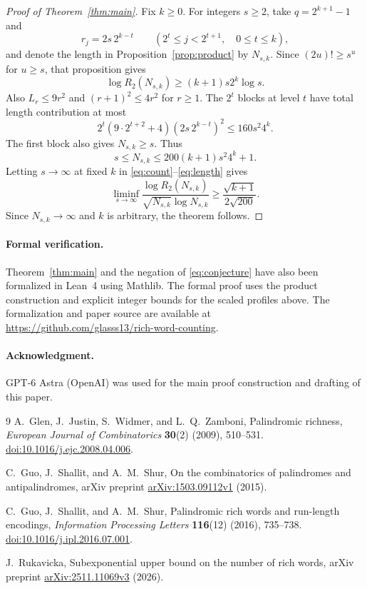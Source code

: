 \documentclass[10pt]{article}
\begin{document}
\begin{proof}[Proof of Theorem~\ref{thm:main}]
Fix $k\ge0$. For integers $s\ge2$, take $q=2^{k+1}-1$ and
\[
 r_j=2s\,2^{k-t}\qquad(2^t\le j<2^{t+1},\quad 0\le t\le k),
\]
and denote the length in Proposition~\ref{prop:product} by $N_{s,k}$.
Since $(2u)!\ge s^u$ for $u\ge s$, that proposition gives
\begin{equation}\label{eq:count}
 \log R_2(N_{s,k})\ge (k+1)s2^k\log s.
\end{equation}
Also $L_r\le9r^2$ and $(r+1)^2\le4r^2$ for $r\ge1$.
The $2^t$ blocks at level $t$ have total length contribution at most
\[
 2^t(9\cdot2^{t+2}+4)(2s\,2^{k-t})^2
 \le160s^2 4^k.
\]
The first block also gives $N_{s,k}\ge s$. Thus
\begin{equation}\label{eq:length}
 s\le N_{s,k}\le200(k+1)s^2 4^k+1.
\end{equation}
Letting $s\to\infty$ at fixed $k$ in
\eqref{eq:count}--\eqref{eq:length} gives
\[
 \liminf_{s\to\infty}
 \frac{\log R_2(N_{s,k})}{\sqrt{N_{s,k}}\log N_{s,k}}
 \ge \frac{\sqrt{k+1}}{2\sqrt{200}}.
\]
Since $N_{s,k}\to\infty$ and $k$ is arbitrary, the theorem follows.
\end{proof}

\paragraph{Formal verification.}
Theorem~\ref{thm:main} and the negation of \eqref{eq:conjecture} have
also been formalized in Lean~4 using Mathlib. The formal proof uses the
product construction and explicit integer bounds for the scaled profiles above.
The formalization and paper source are available at\\
\url{https://github.com/glasss13/rich-word-counting}.

\paragraph{Acknowledgment.}
GPT-6 Astra (OpenAI) was used for the main proof construction and drafting
of this paper.

\begin{thebibliography}{9}
A.~Glen, J.~Justin, S.~Widmer, and L.~Q.~Zamboni,
Palindromic richness,
\emph{European Journal of Combinatorics} \textbf{30}(2) (2009), 510--531.
\href{https://doi.org/10.1016/j.ejc.2008.04.006}{doi:10.1016/j.ejc.2008.04.006}.

C.~Guo, J.~Shallit, and A.~M.~Shur,
On the combinatorics of palindromes and antipalindromes,
arXiv preprint \href{https://arxiv.org/abs/1503.09112v1}{arXiv:1503.09112v1} (2015).

C.~Guo, J.~Shallit, and A.~M.~Shur,
Palindromic rich words and run-length encodings,
\emph{Information Processing Letters} \textbf{116}(12) (2016), 735--738.
\href{https://doi.org/10.1016/j.ipl.2016.07.001}{doi:10.1016/j.ipl.2016.07.001}.

J.~Rukavicka, Subexponential upper bound on the number of rich words,
arXiv preprint \href{https://arxiv.org/abs/2511.11069v3}{arXiv:2511.11069v3} (2026).
\end{thebibliography}
\end{document}
